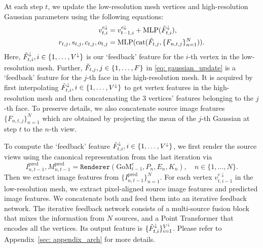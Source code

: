 At each step $t$, we update the low-resolution mesh vertices and high-resolution Gaussian parameters using the following equations:
\begin{align}
    v_{t, i}^{c\downarrow} &= v_{t-1, i}^{c\downarrow} + \text{MLP}(\Tilde{F}_{t, i}^\downarrow), \label{eq: v_update} \\
    r_{t, j}, s_{t, j}, c_{t, j}, o_{t, j} &= \text{MLP}(\text{cat}(\Tilde{F}_{t, j} , \{F_{n, t, j}\}_{n=1}^N)). \label{eq: gaussian_update}
\end{align}
Here, $\Tilde{F}_{t, i}^\downarrow, i\in\{1, \dots, V^\downarrow\}$ is our `feedback' feature for the $i$-th vertex in the low-resolution mesh. Further, $\Tilde{F}_{t, j}, j\in\{1, \dots, F\}$ in \cref{eq: gaussian_update} is a `feedback' feature for the $j$-th face in the high-resolution mesh. It is acquired by first interpolating $\Tilde{F}_{t, i}^\downarrow, i\in\{1, \dots, V^\downarrow\}$ to get vertex features in the high-resolution mesh and then concatenating the 3 vertices' features belonging to the $j$-th face.
To preserve  details, we also concatenate source image features  $\{F_{n, t, j}\}_{n=1}^N$ which are obtained by projecting the mean of the $j$-th Gaussian at step $t$ to the $n$-th view.

To compute the `feedback' feature $\Tilde{F}_{t, i}^\downarrow, i\in\{1, \dots, V^\downarrow\}$, 
we first render the source views using the canonical representation from the last iteration via
\begin{equation}
    I_{n, t-1}^\text{pred}, M_{n, t-1}^\text{pred} = \texttt{Renderer}(\text{GoM}_{t-1}^c, P_n, E_n, K_n), \quad n\in\{1, \dots, N\}.
\end{equation}
Then we extract  image features from $\{I_{n, t-1}^\text{pred}\}_{n=1}^N$. %
For each vertex $v_{t, i-1}^{c\downarrow}$ in the low-resolution mesh, we extract  pixel-aligned 
source image features and predicted image features. We concatenate both and
feed them into an iterative feedback  network. The iterative feedback  network consists of a multi-source fusion block that mixes the information from $N$ sources, and a Point Transformer that encodes all the vertices. Its output feature is $\{\Tilde{F}_{t, i}^\downarrow\}_{i=1}^{V^\downarrow}$. Please refer to Appendix~\ref{sec: appendix_arch} for more details.


